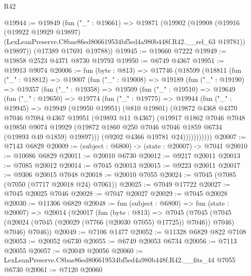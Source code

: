 \begin{lexlean}{R42}
\begin{coremodule}
{@19944 := @19849
    (fun ("_" : @19661) =>
    @19871
      (@19902
        (@19908
          (@19916
            (@19922 @19929 @19897)
            (LexLeanPreserve.C8bae86ed806619534bf5ed4a980b448f.R42.__rel_63 @19781))
          @19897))
      (@17389 @17691 @19788))
@19945 := @19660 @7222
@19949 := @19858 @2523 @4371 @8730 @19793
@19950 := @6749 @4367
@19951 := @19913 @9074
@20006 := fun (byte : @813) =>
  @17746
    (@18599
      (@18811
        (fun ("_" : @18812) =>
        @19007
          (fun ("_" : @19008) =>
          @19189
            (fun ("_" : @19190) =>
            @19357
              (fun ("_" : @19358) =>
              @19509
                (fun ("_" : @19510) =>
                @19649
                  (fun ("_" : @19650) =>
                  @19774
                    (fun ("_" : @19775) =>
                    @19944
                      (fun ("_" : @19945) =>
                      @19949
                        (@19950 @19951)
                        (@810 @19801)
                        (@19872
                          @4368
                          @4370
                          @7046
                          @7084
                          @4367
                          @19951
                          (@19893 @11 @4367)
                          (@19917
                            @1862
                            @7046
                            @7048
                            @19850
                            @9074
                            @19929
                            (@19872 @1860 @250 @7046 @7046 @1859 @6734 (@19893 @49 @1859) @19897)))
                        (@9202 @4366 @19781 @24)))))))))))
@20007 := @7143 @6829
@20009 := (subject : @6800) -> (state : @20007) -> @7041
@20010 := @10086 @6829
@20011 := @20010 @6730
@20012 := @9217 @20011
@20013 := @7085 @20012
@20014 := @7045 @20013
@20015 := @9223 @20011
@20017 := @9306 @20015 @7048
@20018 := @20010 @7055
@20024 := @7045 (@7085 (@7050 (@7717 @20018 @24) @7061))
@20025 := @7049 @17722
@20027 := @7045 @20025 @7046
@20028 := @7047 @20027
@20029 := @7045 @20028
@20030 := @11306 @6829
@20048 := fun (subject : @6800) =>
  fun (state : @20007) =>
  @20014
    (@20017
      (fun (byte : @813) =>
      @7045
        (@7045 (@7045 (@20024 (@7045 (@20029 (@7766 (@20030 @7055) @17725)) @7046)) @7046) @7046)
        @7046))
@20049 := @7106 @1477
@20052 := @11328 @6829 @822 @7108
@20053 := @20052 @6730
@20055 := @6749 @20053 @6734
@20056 := @7113 @20055
@20057 := @20049 @20056
@20060 := LexLeanPreserve.C8bae86ed806619534bf5ed4a980b448f.R42.__fits_44 @7055 @6730
@20061 := @7120 @20060
}
\end{coremodule}
\end{lexlean}
